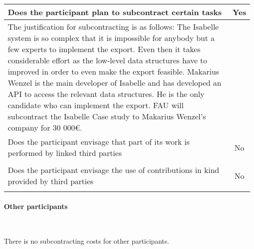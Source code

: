 \bgroup
\def\arraystretch{1.5}  %
\noindent \begin{tabular}{|p{}|c|}
\hline
Does the participant plan to subcontract certain
tasks & Yes \\
\hline
The justification for subcontracting is as follows: 
The Isabelle system is so complex that it is impossible for anybody but a few experts to 
implement the export. Even then it takes considerable effort as the low-level data structures have to 
improved in order to even make the export feasible. Makarius Wenzel is the main developer of Isabelle 
and has developed an API to access the relevant data structures. He is the only candidate who can implement 
the export. FAU will subcontract the Isabelle Case study to Makarius Wenzel's company for 30 000€.& \\
\hline
Does the participant envisage that part of its work
is performed by linked third parties & No \\
\hline
\multicolumn{2}{|l|}{} \\
\hline
Does the participant envisage the use of
contributions in kind provided by
third parties & No \\
\hline
\multicolumn{2}{|l|}{} \\
\hline
\end{tabular}
\egroup


\paragraph{Other participants}\ 

There is no subcontracting costs for other participants.



